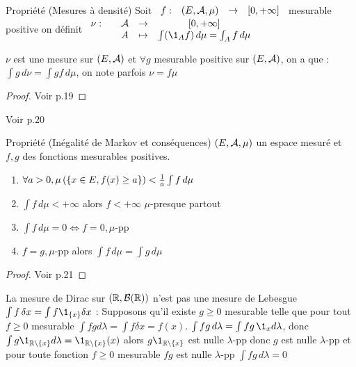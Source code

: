 \documentclass[]{report}
\begin{document}
\begin{df}{Propriété (Mesures à densité)}{}
    Soit $\begin{array}{ccccc} f : & (E,\mathcal{A},\mu) & \to & [0,+\infty] \end{array}$ mesurable positive on définit $\fundfto{\nu}{\Ar}{[0,+\infty]}{A}{\int(\1_A f)\,d\mu=\int_A f\,d\mu}$
\end{df}

\begin{prop}{}{}
    $\nu$ est une mesure sur $(E,\mathcal{A})$ et $\forall g$ mesurable positive sur $(E,\mathcal{A})$, on a que : $\int g\,d\nu=\int gf\,d\mu$, on note parfois $\nu=f\mu$
\end{prop}

\begin{proof}{}{}
    Voir p.19
\end{proof}

\begin{ex}{}{}
    Voir p.20
\end{ex}

\begin{prop}{Propriété (Inégalité de Markov et conséquences)}{}
    $(E,\mathcal{A},\mu)$ un espace mesuré et $f,g$ des fonctions mesurables positives.
    \begin{enumerate}
        \item $\forall a>0,\mu\left( \left\{ x\in E, f(x)\ge a \right\} \right)<\frac{1}{a}\int f\,d\mu$
        \item $\int f\,d\mu<+\infty$ alors $f<+\infty$ $\mu$-presque partout
        \item $\int f\,d\mu=0\iff f=0,\mu$-pp
        \item $f=g,\mu$-pp alors $\int f\,d\mu=\int g\,d\mu$
    \end{enumerate}
\end{prop}

\begin{proof}{}{}
    Voir p.21
\end{proof}

\begin{re}{}{}
    La mesure de Dirac sur $(\mathbb{R},\mathcal{B}(\mathbb{R}))$ n'est pas une mesure de Lebesgue $\int f\,\delta x=\int f\1_{\{x\}}\delta x$ : Supposons qu'il existe $g\ge 0$ mesurable telle que pour tout $f\ge 0$ mesurable $\int fgd\lambda=\int f\delta x=f(x)$.
    $\int fg\,d\lambda=\int fg\,\1_xd\lambda$, donc $\int g\1_{\R\wt\{x\}}d\lambda=\1_{\R\wt\{x\}}(x)$ alors $g\1_{\R\wt\{x\}}$ est nulle $\lambda$-pp donc $g$ est nulle $\lambda$-pp et pour toute fonction $f\ge0$ mesurable $fg$ est nulle $\lambda$-pp $\int fg \,d\lambda=0$
\end{re}
\end{document}
